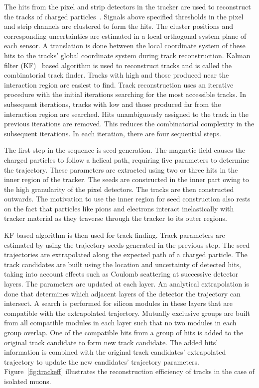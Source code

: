 The hits from the pixel and strip detectors in the tracker are used to reconstruct the tracks of charged particles~\cite{Chatrchyan:2014fea}. Signals above specified thresholds in the pixel and strip channels are clustered to form the hits. The cluster positions and corresponding uncertainties are estimated in a local orthogonal system plane of each sensor. A translation is done between the local coordinate system of these hits to the tracks' global coordinate system during track reconstruction. Kalman filter (KF)~\cite{Fruhwirth:1987fm} based algorithm is used to reconstruct tracks and is called the combinatorial track finder. Tracks with high \pt and those produced near the interaction region are easiest to find. Track reconstruction uses an iterative procedure with the initial iterations searching for the most accessible tracks. In subsequent iterations, tracks with low \pt and those produced far from the interaction region are searched. Hits unambiguously assigned to the track in the previous iterations are removed. This reduces the combinatorial complexity in the subsequent iterations. In each iteration, there are four sequential steps.

The first step in the sequence is seed generation. The magnetic field causes the charged particles to follow a helical path, requiring five parameters to determine the trajectory. These parameters are extracted using two or three hits in the inner region of the tracker. The seeds are constructed in the inner part owing to the high granularity of the pixel detectors. The tracks are then constructed outwards. The motivation to use the inner region for seed construction also rests on the fact that particles like pions and electrons interact inelastically with tracker material as they traverse through the tracker to its outer regions.

KF based algorithm is then used for track finding. Track parameters are estimated by using the trajectory seeds generated in the previous step. The seed trajectories are extrapolated along the expected path of a charged particle. The track candidates are built using the location and uncertainty of detected hits, taking into account effects such as Coulomb scattering at successive detector layers. The parameters are updated at each layer. An analytical extrapolation is done that determines which adjacent layers of the detector the trajectory can intersect. A search is performed for silicon modules in these layers that are compatible with the extrapolated trajectory. Mutually exclusive groups are built from all compatible modules in each layer such that no two modules in each group overlap. One of the compatible hits from a group of hits is added to the original track candidate to form new track candidate. The added hits' information is combined with the original track candidates' extrapolated trajectory to update the new candidates' trajectory parameters. Figure~\ref{fig:trackeff} illustrates the reconstruction efficiency of tracks in the case of isolated muons.

